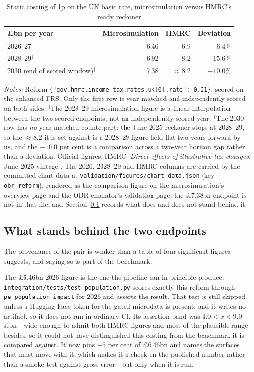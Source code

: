 \begin{table}[ht]
\centering
\caption{Static costing of 1p on the UK basic rate, microsimulation versus HMRC's ready reckoner}
\label{tab:reckoner}
\begin{tabular}{lrrr}
\toprule
\pounds bn per year & Microsimulation & HMRC & Deviation \\
\midrule
2026--27 & 6.46 & 6.9 & $-6.4\%$ \\
2028--29$^{\dagger}$ & 6.92 & 8.2 & $-15.6\%$ \\
2030 (end of scored window)$^{\ddagger}$ & 7.38 & $\approx$8.2 & $-10.0\%$ \\
\bottomrule
\end{tabular}

\medskip
\parbox{0.92\textwidth}{\footnotesize \emph{Notes:} Reform \texttt{\{"gov.hmrc.income\_tax.rates.uk[0].rate": 0.21\}}, scored on the enhanced FRS. Only the first row is year-matched and independently scored on both sides. $^{\dagger}$The 2028--29 microsimulation figure is a linear interpolation between the two scored endpoints, not an independently scored year. $^{\ddagger}$The 2030 row has \emph{no} year-matched counterpart: the June 2025 reckoner stops at 2028--29, so the $\approx$8.2 it is set against is a 2028--29 figure held flat two years forward by us, and the $-10.0$ per cent is a comparison across a two-year horizon gap rather than a deviation. Official figures: HMRC, \emph{Direct effects of illustrative tax changes}, June 2025 vintage \citep{hmrc2025reckoner}. The 2026, 2028--29 and HMRC columns are carried by the committed chart data at \texttt{validation/figures/chart\_data.json} (key \texttt{obr\_reform}), rendered as the comparison figure on the microsimulation's overview page and the OBR emulator's validation page; the \pounds 7.38bn endpoint is not in that file, and Section~\ref{sec:reckonerprov} records what does and does not stand behind it.}
\end{table}

\subsection{What stands behind the two endpoints}
\label{sec:reckonerprov}

The provenance of the pair is weaker than a table of four significant figures suggests, and saying so is part of the benchmark.

The \pounds 6.46bn 2026 figure is the one the pipeline can in principle produce: \texttt{integration/tests/test\_population.py} scores exactly this reform through \texttt{pe\_population\_impact} for 2026 and asserts the result. That test is still skipped unless a Hugging Face token for the gated microdata is present, and it writes no artifact, so it does not run in ordinary CI. Its assertion band was $4.0 < x < 9.0$ \pounds bn---wide enough to admit both HMRC figures and most of the plausible range besides, so it could not have distinguished this costing from the benchmark it is compared against. It now pins $\pm 5$ per cent of \pounds 6.46bn and names the surfaces that must move with it, which makes it a check on the published number rather than a smoke test against gross error---but only when it is run.

